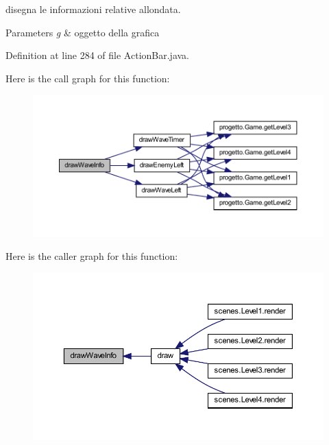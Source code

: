 disegna le informazioni relative all\textquotesingle{}ondata. 


\begin{DoxyParams}{Parameters}
{\em g} & oggetto della grafica \\
\hline
\end{DoxyParams}


Definition at line 284 of file Action\+Bar.\+java.

Here is the call graph for this function\+:\nopagebreak
\begin{figure}[H]
\begin{center}
\leavevmode
\includegraphics[width=350pt]{classui_1_1_action_bar_a4202926f30a7290c360bfcd4af6b03cb_cgraph}
\end{center}
\end{figure}
Here is the caller graph for this function\+:\nopagebreak
\begin{figure}[H]
\begin{center}
\leavevmode
\includegraphics[width=350pt]{classui_1_1_action_bar_a4202926f30a7290c360bfcd4af6b03cb_icgraph}
\end{center}
\end{figure}
\mbox{\label{classui_1_1_action_bar_aeb491734ea2c8ae2f1be9db4f930d22a}} 

